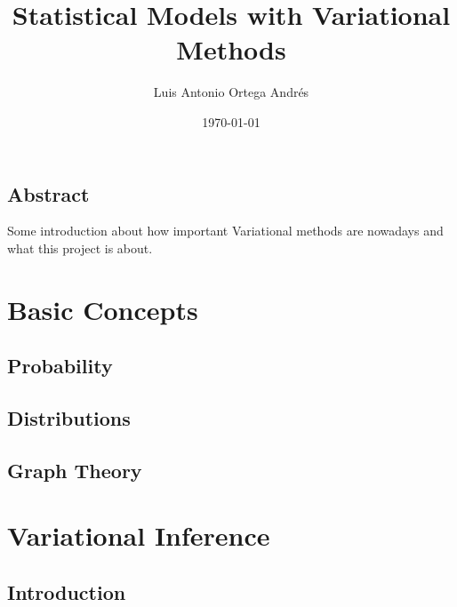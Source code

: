 \documentclass[twoside,openright,titlepage,numbers=noenddot,openany,headinclude,footinclude=true, cleardoublepage=empty,abstractoff,BCOR=5mm,paper=a4,fontsize=11pt, dvipsnames]{scrreprt}
\author{Luis Antonio Ortega Andrés}
\date{\today}
\title{Statistical Models with Variational Methods}
\begin{document}
\maketitle

\chapter*{Abstract}

Some introduction about how important Variational methods are nowadays and what this project is about.

\tableofcontents

\part{Basic Concepts}

\chapter{Probability}



\chapter{Distributions}



\chapter{Graph Theory}




\ctparttext{
  \color{black}
  \begin{center}

  \end{center}
}
\part{Variational Inference}

\chapter{Introduction}
\end{document}

